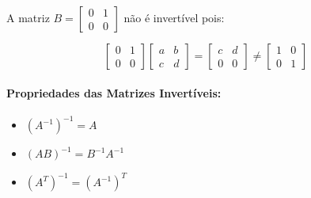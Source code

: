 A matriz \( B = \begin{bmatrix} 0 & 1 \\ 0 & 0 \end{bmatrix} \) não é invertível pois:

\[
\begin{bmatrix} 0 & 1 \\ 0 & 0 \end{bmatrix}
\begin{bmatrix} a & b \\ c & d \end{bmatrix} =
\begin{bmatrix} c & d \\ 0 & 0 \end{bmatrix}
\neq
\begin{bmatrix} 1 & 0 \\ 0 & 1 \end{bmatrix}
\]

\paragraph{Propriedades das Matrizes Invertíveis:}

\begin{itemize}
    \item ${(A^{-1})}^{-1} = A$
    \item ${(AB)}^{-1} = B^{-1}A^{-1}$
    \item ${(A^T)}^{-1} = {(A^{-1})}^T$
\end{itemize}